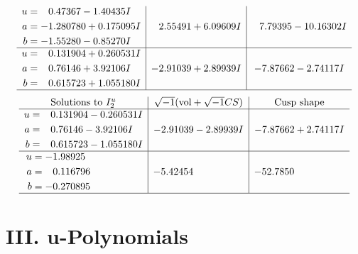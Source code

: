 \documentclass[1p]{elsarticle_modified}
\theoremstyle{definition}
\newcommand{\I}{\sqrt{-1}}
\begin{document}
$$\begin{array}{c|c|c}
\begin{aligned}
u &= \phantom{-}0.47367 - 1.40435 I \\
a &= -1.280780 + 0.175095 I \\
b &= -1.55280 - 0.85270 I\end{aligned}
 & \phantom{-}2.55491 + 6.09609 I & \phantom{-}7.79395 - 10.16302 I \\ \hline\begin{aligned}
u &= \phantom{-}0.131904 + 0.260531 I \\
a &= \phantom{-}0.76146 + 3.92106 I \\
b &= \phantom{-}0.615723 + 1.055180 I\end{aligned}
 & -2.91039 + 2.89939 I & -7.87662 - 2.74117 I\\
 \hline 
 \end{array}$$\newpage$$\begin{array}{c|c|c}  
\text{Solutions to }I^u_{2}& \I (\text{vol} + \sqrt{-1}CS) & \text{Cusp shape}\\
 \hline 
\begin{aligned}
u &= \phantom{-}0.131904 - 0.260531 I \\
a &= \phantom{-}0.76146 - 3.92106 I \\
b &= \phantom{-}0.615723 - 1.055180 I\end{aligned}
 & -2.91039 - 2.89939 I & -7.87662 + 2.74117 I \\ \hline\begin{aligned}
u &= -1.98925\phantom{ +0.000000I} \\
a &= \phantom{-}0.116796\phantom{ +0.000000I} \\
b &= -0.270895\phantom{ +0.000000I}\end{aligned}
 & -5.42454\phantom{ +0.000000I} & -52.7850\phantom{ +0.000000I}\\
 \hline 
 \end{array}$$\newpage
\newpage\renewcommand{\arraystretch}{1}
\centering \section*{ III. u-Polynomials}
\end{document}
